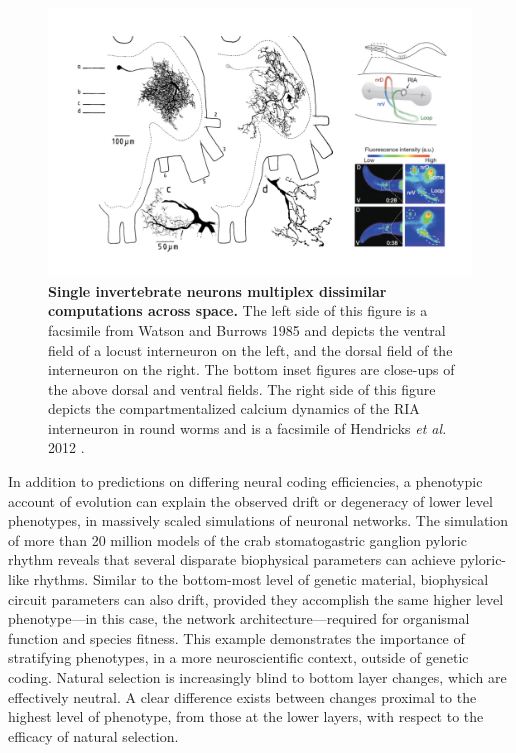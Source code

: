 \documentclass[twocolumn]{article}
\begin{document}
\begin{figure}[htp]
\centering
\includegraphics[width=13 cm]{fig_4.jpeg}
\caption{\textbf{Single invertebrate neurons multiplex dissimilar computations across space.} The left side of this figure is a facsimile from Watson and Burrows 1985 \cite{watson_burrows_1985} and depicts the ventral field of a locust interneuron on the left, and the dorsal field of the interneuron on the right. The bottom inset figures are close-ups of the above dorsal and ventral fields. The right side of this figure depicts the compartmentalized calcium dynamics of the RIA interneuron in round worms and is a facsimile of Hendricks \textit{et al.} 2012 \cite{Hendricks_Ha_Maffey_Zhang_2012}.}
\end{figure}

In addition to predictions on differing neural coding efficiencies, a phenotypic account of evolution can explain the observed drift or degeneracy of lower level phenotypes, in massively scaled simulations of neuronal networks. The simulation of more than 20 million models of the crab stomatogastric ganglion pyloric rhythm reveals that several disparate biophysical parameters can achieve pyloric-like rhythms. Similar to the bottom-most level of genetic material, biophysical circuit parameters can also drift, provided they accomplish the same higher level phenotype---in this case, the network architecture---required for organismal function and species fitness. This example demonstrates the importance of stratifying phenotypes, in a more neuroscientific context, outside of genetic coding. Natural selection is increasingly blind to bottom layer changes, which are effectively neutral. A clear difference exists between changes proximal to the highest level of phenotype, from those at the lower layers, with respect to the efficacy of natural selection. 
\end{document}
